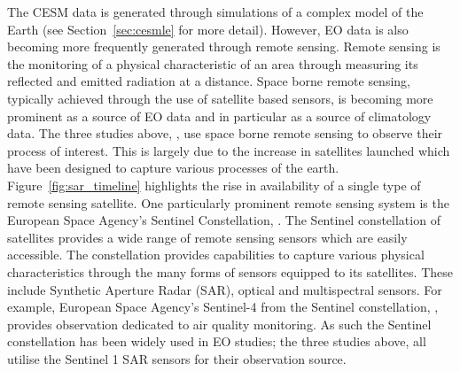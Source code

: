 The CESM data is generated through simulations of a complex model of the Earth (see Section~\ref{sec:cesmle} for more detail).
However, EO data is also becoming more frequently generated through remote sensing.
Remote sensing is the monitoring of a physical characteristic of an area through measuring its reflected and emitted radiation at a distance. 
Space borne remote sensing, typically achieved through the use of satellite based sensors, is becoming more prominent as a source of EO data and in particular as a source of climatology data.
The three studies above, \citep{muro_short-term_2016, raspini_continuous_2018, khabbazan_crop_2019}, use space borne remote sensing to observe their process of interest. 
This is largely due to the increase in satellites launched which have been designed to capture various processes of the earth.
Figure~\ref{fig:sar_timeline} highlights the rise in availability of a single type of remote sensing satellite.
One particularly prominent remote sensing system is the European Space Agency's Sentinel Constellation, \cite{aschbacher_european_2012}.
The Sentinel constellation of satellites provides a wide range of remote sensing sensors which are easily accessible.
The constellation provides capabilities to capture various physical characteristics through the many forms of sensors equipped to its satellites.
These include  Synthetic Aperture Radar (SAR), optical and multispectral sensors.
For example, European Space Agency's Sentinel-4 from the Sentinel constellation, \cite{aschbacher_european_2012}, provides observation dedicated to air quality monitoring.
As such the Sentinel constellation has been widely used in EO studies; the three studies above, \citep{muro_short-term_2016, khabbazan_crop_2019, raspini_continuous_2018}  all utilise the Sentinel 1 SAR sensors for their observation source. 


